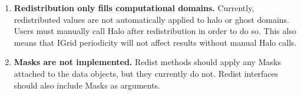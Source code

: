 

\begin{enumerate}

\item {\bf Redistribution only fills computational domains.}  Currently,
redistributed values are not automatically applied to halo or ghost
domains.  Users must manually call Halo after redistribution in order
to do so.  This also means that IGrid periodicity will not affect
results without manual Halo calls.

\item {\bf Masks are not implemented.}  Redist methods should apply
any Masks attached to the data objects, but they currently do not.  Redist
interfaces should also include Masks as arguments.

\end{enumerate}


